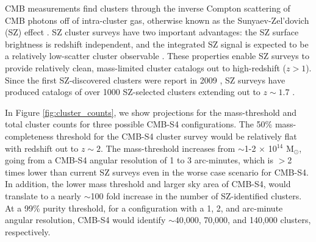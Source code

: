 CMB measurements find clusters through the inverse Compton scattering of CMB photons off of intra-cluster gas, otherwise 
known as the Sunyaev-Zel'dovich (SZ) effect \cite{Sunyaev:1972eq}. SZ cluster surveys have two important advantages: 
the SZ surface brightness is redshift independent, and the integrated SZ signal is expected to be a relatively 
low-scatter cluster observable \cite{Nagai:2005wx, Nagai:2007mt, Kravtsov:2012zs}.  These properties enable SZ surveys to provide 
relatively clean, mass-limited cluster catalogs out to high-redshift ($z > 1$).  Since the first SZ-discovered clusters were 
report in 2009 \cite{Staniszewski:2008ma}, SZ surveys have produced catalogs of over 1000 SZ-selected clusters extending out to $z \sim 1.7$ 
\cite{Vanderlinde:2010eb, Reichardt:2012yj, Hasselfield:2013wf, Ade:2013skr, Bleem:2014iim, Ade:2015mva}.  



In Figure \ref{fig:cluster_counts}, we show projections for the mass-threshold and total cluster counts for three possible CMB-S4 configurations.  
The 50\% mass-completeness threshold for the CMB-S4 cluster survey would be relatively flat with redshift out to $z \sim 2$.  
The mass-threshold increases from $\sim$1-2 $\times$ 10$^{14}$ M$_{\odot}$, going from a CMB-S4 angular resolution 
of 1 to 3 arc-minutes, which is $>$2 times lower than current SZ surveys even in the worse case scenario for CMB-S4.  
In addition, the lower mass threshold and larger sky area of CMB-S4, would translate to a nearly $\sim$100 fold increase in the 
number of SZ-identified clusters.  At a 99\% purity threshold, for a configuration with a 1, 2, and arc-minute angular 
resolution, CMB-S4 would identify $\sim$40,000, 70,000, and 140,000 clusters, respectively.  


